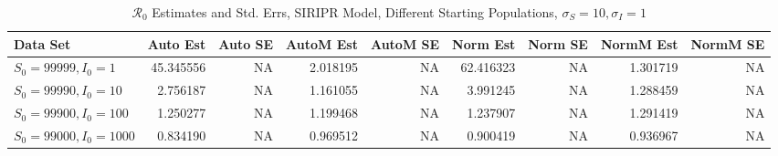 \documentclass[12pt]{article}
\newcommand{\rr}{\ensuremath{\mathcal{R}_0}}
\begin{document}
\begin{table}[H]
	
	\caption{$\rr$ Estimates and Std. Errs, SIRIPR Model,
		Different Starting Populations, 
		$\sigma_S = 10, \sigma_I = 1$}
	\begin{footnotesize}
		\hskip -1.7cm
	\begin{tabular}{l|r|r|r|r|r|r|r|r}
		\hline
		Data Set & Auto Est & Auto SE & AutoM Est & AutoM SE & Norm Est & Norm SE & NormM Est & NormM SE\\
		\hline
		$S_0 = 99999, I_0 = 1$ & 45.345556 & NA & 2.018195 & NA & 62.416323 & NA & 1.301719 & NA\\
		\hline
		$S_0 = 99990, I_0 = 10$ & 2.756187 & NA & 1.161055 & NA & 3.991245 & NA & 1.288459 & NA\\
		\hline
		$S_0 = 99900, I_0 = 100$ & 1.250277 & NA & 1.199468 & NA & 1.237907 & NA & 1.291419 & NA\\
		\hline
		$S_0 = 99000, I_0 = 1000$ & 0.834190 & NA & 0.969512 & NA & 0.900419 & NA & 0.936967 & NA\\
		\hline
	\end{tabular}
\end{footnotesize}
\end{table}
\end{document}
